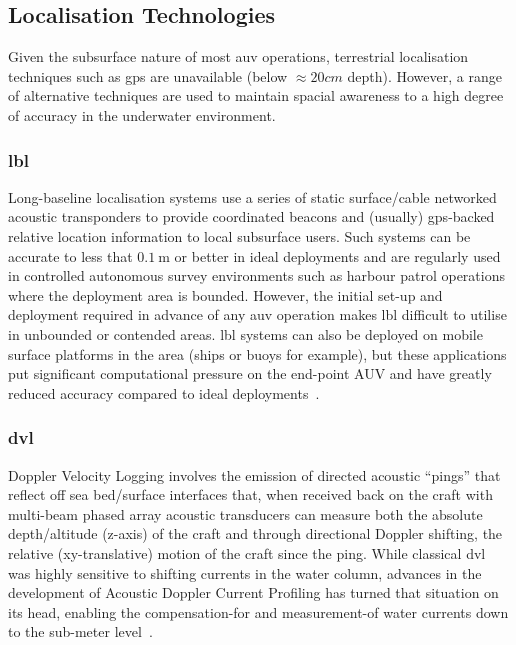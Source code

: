 \subsection{Localisation Technologies}

Given the subsurface nature of most \gls{auv} operations, terrestrial localisation techniques such as \gls{gps} are unavailable (below $\approx 20cm$ depth). 
However, a range of alternative techniques are used to maintain spacial awareness to a high degree of accuracy in the underwater environment.
\subsubsection{\gls{lbl}}
Long-baseline localisation systems use a series of static surface/cable networked acoustic transponders to provide coordinated beacons and (usually) \gls{gps}-backed relative location information to local subsurface users. 
Such systems can be accurate to less that $0.\SI{1}{\meter}$ or better in ideal deployments and are regularly used in controlled autonomous survey environments such as harbour patrol operations where the deployment area is bounded. 
However, the initial set-up and deployment required in advance of any \gls{auv} operation makes \gls{lbl} difficult to utilise in unbounded or contended areas.
\gls{lbl} systems can also be deployed on mobile surface platforms in the area (ships or buoys for example), but these applications put significant computational pressure on the end-point AUV and have greatly reduced accuracy compared to ideal deployments~\cite{Matos1999}.
\subsubsection{\gls{dvl}}
Doppler Velocity Logging involves the emission of directed acoustic ``pings'' that reflect off sea bed/surface interfaces that, when received back on the craft with multi-beam phased array acoustic transducers can measure both the absolute depth/altitude (z-axis) of the craft and through directional Doppler shifting, the relative (xy-translative) motion of the craft since the ping.
While classical \gls{dvl} was highly sensitive to shifting currents in the water column, advances in the development of Acoustic Doppler Current Profiling has turned that situation on its head, enabling the compensation-for and measurement-of water currents down to the sub-meter level~\cite{Snyder2010}.
